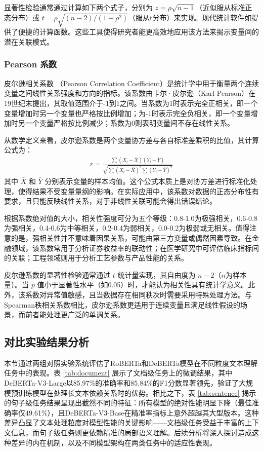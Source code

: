 显著性检验通常通过计算如下两个式子，分别为 $z = \rho \sqrt{n-1}$（近似服从标准正态分布）或 $t = \rho \sqrt{(n-2)/(1-\rho ^2)}$（服从t分布）来实现。现代统计软件如提供了便捷的计算函数。这些工具使得研究者能更高效地应用该方法来揭示变量间的潜在关联模式。

\subsubsection{Pearson 系数}

皮尔逊相关系数 \cite{Pearson} （Pearson Correlation Coefficient）是统计学中用于衡量两个连续变量之间线性关系强度和方向的指标。该系数由卡尔·皮尔逊（Karl Pearson）在19世纪末提出，其取值范围介于-1到1之间。当系数为1时表示完全正相关，即一个变量增加时另一个变量也严格按比例增加；为-1时表示完全负相关，即一个变量增加时另一个变量严格按比例减少；系数为0则表明变量间不存在线性关系。

从数学定义来看，皮尔逊系数是两个变量协方差与各自标准差乘积的比值，其计算公式为：
\begin{align}
r = \frac{\sum{(X_i - \bar{X})(Y_i - \bar{Y})}}{\sqrt{\sum{(X_i - \bar{X})^2}\sum{(Y_i - \bar{Y})^2}}}
\end{align}
其中 $\bar{X}$ 和 $\bar{Y}$ 分别表示变量的样本均值。这个公式本质上是对协方差进行标准化处理，使得结果不受变量量纲的影响。在实际应用中，该系数对数据的正态分布性有要求，且只能反映线性关系，对于非线性关联可能会得出错误结论。

根据系数绝对值的大小，相关性强度可分为五个等级：0.8-1.0为极强相关，0.6-0.8为强相关，0.4-0.6为中等相关，0.2-0.4为弱相关，0.0-0.2为极弱或无相关。值得注意的是，强相关性并不意味着因果关系，可能由第三方变量或偶然因素导致。在金融领域，该系数常用于分析证券收益率的联动性；在医学研究中可评估临床指标间的关联；工程领域则用于分析工艺参数与产品性能的关系。

皮尔逊系数的显著性检验通常通过 $t$ 统计量实现，其自由度为 $n-2$（$n$为样本量）。当 $p$ 值小于显著性水平（如0.05）时，才能认为相关性具有统计学意义。此外，该系数对异常值敏感，且当数据存在相同秩次时需要采用特殊处理方法。与Spearman秩相关系数相比，皮尔逊系数更适用于连续变量且满足线性假设的场景，而前者能处理更广泛的单调关系。

\subsection{对比实验结果分析}
\label{sec:method-experiment-main}

本节通过两组对照实验系统评估了RoBERTa和DeBERTa模型在不同粒度文本理解任务中的表现。表 \ref{tab:document} 展示了文档级任务上的微调结果，其中DeBERTa-V3-Large以85.97\%的准确率和85.84\%的F1分数显著领先，验证了大规模预训练模型在处理长文本依赖关系时的优势。相比之下，表 \ref{tab:sentence} 揭示的句子级任务结果呈现出截然不同的特征：所有模型的绝对性能明显下降（最佳准确率仅49.61\%），且DeBERTa-V3-Base在精准率指标上意外超越其大型版本。这种差异凸显了文本处理粒度对模型性能的关键影响——文档级任务受益于丰富的上下文信息，而句子级任务则更依赖精准的局部语义理解。后续分析将深入探讨造成这种差异的内在机制，以及不同模型架构在两类任务中的适应性表现。

